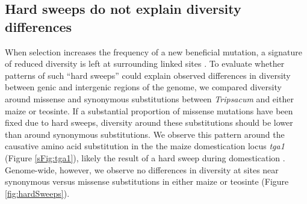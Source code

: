 \documentclass[twoside, twocolumn, letterpaper]{article}
\begin{document}
\subsection*{Hard sweeps do not explain diversity differences} %
When selection increases the frequency of a new beneficial mutation, a signature of reduced diversity is left at surrounding linked sites \cite{smith1974}.
To evaluate whether patterns of such ``hard sweeps'' could explain observed differences in diversity between genic and intergenic regions of the genome, we compared diversity around missense and synonymous substitutions between \emph{Tripsacum} and either maize or teosinte.
If a substantial proportion of missense mutations have been fixed due to hard sweeps, diversity around these substitutions should be lower than around synonymous substitutions. 
We observe this pattern around the causative amino acid substitution in the the maize domestication locus \emph{tga1} (Figure \ref{sFig:tga1}), likely the result of a hard sweep during domestication \cite{wang2005, wang2015}. Genome-wide, however, we observe no differences in diversity at sites near synonymous versus missense substitutions in either maize or teosinte (Figure \ref{fig:hardSweeps}).

\end{document}
